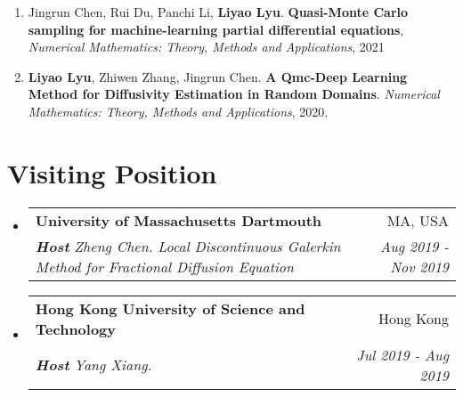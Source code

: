 \documentclass[letterpaper,10.8pt]{article}
\makeatletter
\newcommand{\resumeSubheading}[4]{
  \vspace{-1pt}\item
    \begin{tabular*}{0.97\textwidth}{l@{\extracolsep{\fill}}r}
      \textbf{#1} & #2 \\
      \textit{\small#3} & \textit{\small #4} \\
    \end{tabular*}\vspace{-5pt}
}
\newcommand{\resumeSubHeadingListStart}{\begin{itemize}[leftmargin=*]}
\newcommand{\resumeSubHeadingListEnd}{\end{itemize}}
\makeatother
\begin{document}
\begin{enumerate}
\item  Jingrun Chen, Rui Du, Panchi Li, \textbf{{{\color{MSLightBlue}Liyao Lyu}}}.\textbf{ Quasi-Monte Carlo sampling for machine-learning partial differential equations}, \emph{Numerical Mathematics: Theory, Methods and Applications}, 2021

\item \textbf{{{\color{MSLightBlue}Liyao Lyu}}}, Zhiwen Zhang, Jingrun Chen.\textbf{ A Qmc-Deep Learning Method for Diffusivity Estimation in Random Domains}. \emph{Numerical Mathematics: Theory, Methods and Applications}, 2020.



\end{enumerate}

\section{Visiting Position}
  \resumeSubHeadingListStart
    \resumeSubheading
    {\color{MSLightBlue}University of Massachusetts Dartmouth}{MA, USA}
    {\textbf{\emph{Host}}
          {Zheng Chen.} \quad \emph{Local Discontinuous Galerkin Method for Fractional Diffusion
Equation}}{Aug 2019 -  Nov 2019}

\resumeSubHeadingListEnd
      
      
      \resumeSubHeadingListStart
    \resumeSubheading
    {\color{MSLightBlue}Hong Kong University of Science and Technology}{Hong Kong}
    {\textbf{\emph{Host}}
          {Yang Xiang.}\quad \emph{} }{Jul 2019 -  Aug 2019}
\resumeSubHeadingListEnd


   




\end{document}
